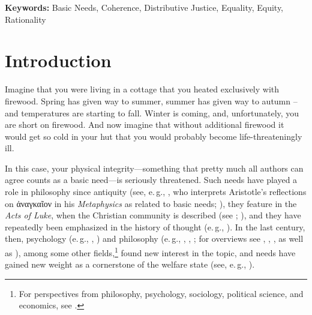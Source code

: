 \documentclass[egregdoesnotlikesansseriftitles]{scrartcl}
\begin{document}
\noindent\textbf{Keywords:} Basic Needs, Coherence, Distributive Justice, Equality, Equity, Rationality


\renewcommand{\thefootnote}{\arabic{footnote}}\setcounter{footnote}{0}
\newpage


\section{Introduction}\label{sec:introduction}
Imagine that you were living in a cottage that you heated exclusively with firewood.
Spring has given way to summer, summer has given way to autumn – and temperatures are starting to fall.
Winter is coming, and, unfortunately, you are short on firewood.
And now imagine that without additional firewood it would get so cold in your hut that you would probably become life-threateningly ill.

In this case, your physical integrity---something that pretty much all authors can agree counts as a basic need---is seriously threatened.
Such needs have played a role in philosophy since antiquity (see, e.\,g., \citealt{poelzler_basic_2021}, who interprets Aristotle's reflections on \textgreek{ἀναγκαῖον} in his \textit{Metaphysics} as related to basic needs; \citealt[1015a20--1015b15]{aristotle_metaphysics_1933}), they feature in the \textit{Acts of Luke}, when the Christian community is described (see \citealt[p. 302f.]{bauer_gerechtigkeit_2019}; \citealt[p. 141f.]{luke_apostelgeschichte_2016}), and they have repeatedly been emphasized in the history of thought (e.\,g., \citealt{marx_kritik_1969}).
In the last century, then, psychology (e.\,g., \citealt{maslow_theory_1943}, \citealt{alderfer_existence_1972}) and philosophy (e.\,g., \citealt{thomson_need_1987}, \citealt{miller_principles_1999}, \citealt{hamilton_political_2003}; for overviews see \citealt{brock_needs_2019}, \citealt{miller_needs_2020}, \citealt{siebel_need-based_2020}, as well as \citealt{poelzler_basic_2021}), among some other fields,\footnote{For perspectives from philosophy, psychology, sociology, political science, and economics, see \cite{kittel_need-based_2020}.} found new interest in the topic, and needs have gained new weight as a cornerstone of the welfare state (see, e.\,g., \citealt{esping-andersen_three_1990}).
\end{document}
